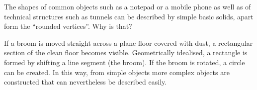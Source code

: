 



%

\begin{MIntro}

The shapes of common objects such as a notepad or a mobile phone as well as of
technical structures such as tunnels can be described by simple basic solids,
apart form the ``rounded vertices''. Why is that?

If a broom is moved straight across a plane floor covered with dust, 
a rectangular section of the clean floor becomes visible. Geometrically idealised, 
a rectangle is formed by shifting a line segment (the broom). If the 
broom is rotated, a circle can be created. In this way, from simple 
objects more complex objects are constructed that can nevertheless be described easily.

\end{MIntro}

